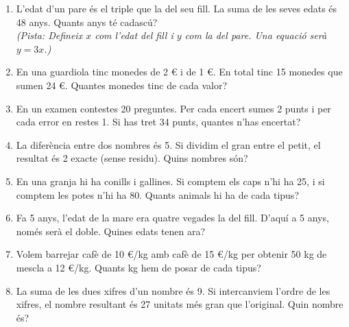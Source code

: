 \documentclass[12pt,a4paper]{article}
\begin{document}
\begin{enumerate}[label=\textbf{\arabic*.}]
    \item L'edat d'un pare és el triple que la del seu fill. La suma de les seves edats és 48 anys. Quants anys té cadascú? \\
    {\small \textit{(Pista: Defineix $x$ com l'edat del fill i $y$ com la del pare. Una equació serà $y=3x$.)}}
    
    \item En una guardiola tinc monedes de 2 € i de 1 €. En total tinc 15 monedes que sumen 24 €. Quantes monedes tinc de cada valor?
    \item En un examen contestes 20 preguntes. Per cada encert sumes 2 punts i per cada error en restes 1. Si has tret 34 punts, quantes n'has encertat?
    \item La diferència entre dos nombres és 5. Si dividim el gran entre el petit, el resultat és 2 exacte (sense residu). Quins nombres són?
    \item En una granja hi ha conills i gallines. Si comptem els caps n'hi ha 25, i si comptem les potes n'hi ha 80. Quants animals hi ha de cada tipus?
    \item Fa 5 anys, l'edat de la mare era quatre vegades la del fill. D'aquí a 5 anys, només serà el doble. Quines edats tenen ara?
    \item Volem barrejar cafè de 10 €/kg amb cafè de 15 €/kg per obtenir 50 kg de mescla a 12 €/kg. Quants kg hem de posar de cada tipus?
    \item La suma de les dues xifres d'un nombre és 9. Si intercanviem l'ordre de les xifres, el nombre resultant és 27 unitats més gran que l'original. Quin nombre és?
\end{enumerate}
\end{document}
